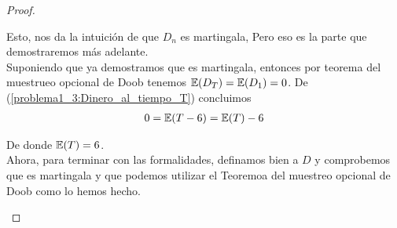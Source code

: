 \begin{proof}
\begin{enumerate}
		   	Esto, nos da la intuición de que $D_n$ es martingala, Pero eso es la parte que demostraremos más adelante.\\
		   
			Suponiendo que ya demostramos que es martingala, entonces por teorema del muestrueo opcional de Doob
			tenemos $\mathbb{E}(D_T) = \mathbb{E}(D_1) = 0$. De (\ref{problema1_3:Dinero_al_tiempo_T}) concluimos
			\begin{align}
				0 = \mathbb{E}(T - 6) = \mathbb{E}(T) - 6
			\end{align}
			
			De donde $\mathbb{E}(T) = 6$.\\
			
			Ahora, para terminar con las formalidades, definamos bien a $D$ y comprobemos que es martingala y 
			que podemos utilizar el Teoremoa del muestreo opcional de Doob como lo hemos hecho.
			
			
	\end{enumerate}
\end{proof}
